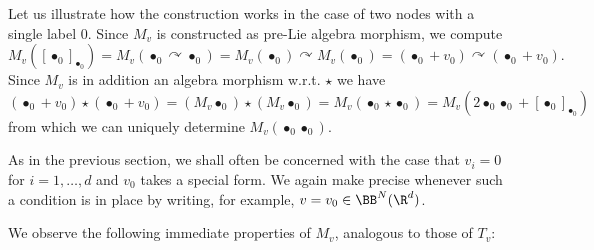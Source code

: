 \documentclass{article}
\begin{document}
\begin{example}
Let us illustrate how the construction works in the case of two nodes with a single label $0$. Since $M_{v}$ is constructed as pre-Lie algebra morphism, we compute
\[
M_{v}\left( \left[ \bullet_0 \right] _{\bullet_0} \right) = M_{v}\left( \bullet_0 \curvearrowright \bullet_0 \right) = M_{v}\left( \bullet_0 \right) \curvearrowright M_{v}\left( \bullet_0 \right) =\left( \bullet_0 +v_0\right) \curvearrowright \left( \bullet_0 +v_0\right).
\]
Since $M_{v}$ is in addition an algebra morphism w.r.t. $\star$ we have
\[
\left( \bullet_0 +v_0\right) \star \left( \bullet_0 +v_0\right) =\left( M_{v}\bullet_0 \right) \star \left( M_{v}\bullet_0 \right) = M_{v}\left( \bullet_0 \star \bullet_0 \right) = M_{v}\left( 2\bullet_0 \bullet_0 +\left[ \bullet_0 \right]_{\bullet_0}\right) 
\]
from which we can uniquely determine $M_{v}\left( \bullet_0 \bullet_0 \right) $.
\end{example}

As in the previous section, we shall often be concerned with the case that $v_i = 0$ for $i = 1,\ldots, d$ and $v_0$ takes a special form. We again make precise whenever such a condition is in place by writing, for example, $v = v_0 \in \BB^N(\R^{d})$.


We observe the following immediate properties of $M_v$, analogous to those of $T_v$:
\end{document}
